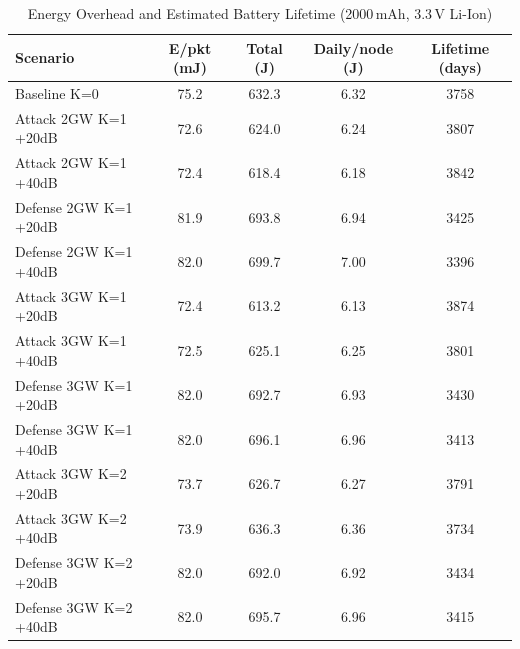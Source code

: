 \begin{table}[t]
\centering
\caption{Energy Overhead and Estimated Battery Lifetime (2000\,mAh, 3.3\,V Li-Ion)}
\label{tab:energy}
\begin{tabular}{lcccc}
\toprule
Scenario & E/pkt (mJ) & Total (J) & Daily/node (J) & Lifetime (days) \\
\midrule
Baseline K=0 & 75.2 & 632.3 & 6.32 & 3758 \\
Attack 2GW K=1 +20dB & 72.6 & 624.0 & 6.24 & 3807 \\
Attack 2GW K=1 +40dB & 72.4 & 618.4 & 6.18 & 3842 \\
Defense 2GW K=1 +20dB & 81.9 & 693.8 & 6.94 & 3425 \\
Defense 2GW K=1 +40dB & 82.0 & 699.7 & 7.00 & 3396 \\
Attack 3GW K=1 +20dB & 72.4 & 613.2 & 6.13 & 3874 \\
Attack 3GW K=1 +40dB & 72.5 & 625.1 & 6.25 & 3801 \\
Defense 3GW K=1 +20dB & 82.0 & 692.7 & 6.93 & 3430 \\
Defense 3GW K=1 +40dB & 82.0 & 696.1 & 6.96 & 3413 \\
Attack 3GW K=2 +20dB & 73.7 & 626.7 & 6.27 & 3791 \\
Attack 3GW K=2 +40dB & 73.9 & 636.3 & 6.36 & 3734 \\
Defense 3GW K=2 +20dB & 82.0 & 692.0 & 6.92 & 3434 \\
Defense 3GW K=2 +40dB & 82.0 & 695.7 & 6.96 & 3415 \\
\bottomrule
\end{tabular}
\end{table}
